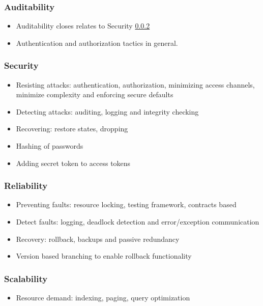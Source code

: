 \documentclass{article}
\begin{document}
		\subsubsection{Auditability}\label{subsec:auditability}
		\begin{itemize}
			\item Auditability closes relates to Security \ref{subsec:security}
			\item Authentication and authorization tactics in general.
		\end{itemize}

		\subsubsection{Security}\label{subsec:security}
		\begin{itemize}
			\item Resisting attacks: authentication, authorization, minimizing access channels, minimize complexity and enforcing secure defaults
			\item Detecting attacks: auditing, logging and integrity checking
			\item Recovering: restore states, dropping
			\item Hashing of passwords
			\item Adding secret token to access tokens
		\end{itemize}

		\subsubsection{Reliability}\label{subsec:reliability}
		\begin{itemize}
			\item Preventing faults: resource locking, testing framework, contracts based
			\item Detect faults: logging, deadlock detection and error/exception communication
			\item Recovery: rollback, backups and passive redundancy
			\item Version based branching to enable rollback functionality
		\end{itemize}

		\subsubsection{Scalability}\label{subsec:scalability}
		\begin{itemize}
			\item Resource demand: indexing, paging, query optimization
		\end{itemize}
\end{document}
